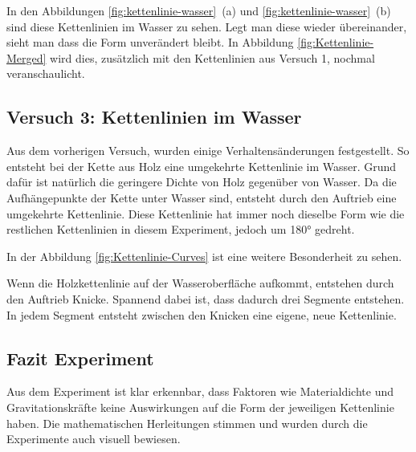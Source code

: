 In den Abbildungen \ref{fig:kettenlinie-wasser}~(a) und
\ref{fig:kettenlinie-wasser}~(b) sind diese Kettenlinien im Wasser zu sehen.
Legt man diese wieder übereinander, sieht man dass die Form unverändert bleibt.
In Abbildung \ref{fig:Kettenlinie-Merged} wird dies, zusätzlich mit den Kettenlinien aus Versuch 1, nochmal veranschaulicht.

\subsection{Versuch 3: Kettenlinien im Wasser
\label{kettenlinie:subsection:wasser}}

Aus dem vorherigen Versuch, wurden einige Verhaltensänderungen festgestellt.
So entsteht bei der Kette aus Holz eine umgekehrte Kettenlinie im Wasser.
Grund dafür ist natürlich die geringere Dichte von Holz gegenüber von Wasser.
Da die Aufhängepunkte der Kette unter Wasser sind, entsteht durch den Auftrieb eine umgekehrte Kettenlinie.
Diese Kettenlinie hat immer noch dieselbe Form wie die restlichen Kettenlinien in diesem Experiment, jedoch um 180° gedreht.

In der Abbildung \ref{fig:Kettenlinie-Curves} ist eine weitere Besonderheit zu sehen.

Wenn die Holzkettenlinie auf der Wasseroberfläche aufkommt, entstehen durch den Auftrieb Knicke.
Spannend dabei ist, dass dadurch drei Segmente entstehen.
In jedem Segment entsteht zwischen den Knicken eine eigene, neue Kettenlinie.


\subsection{Fazit Experiment
\label{kettenlinie:subsection:fazit-experiment}}
Aus dem Experiment ist klar erkennbar, dass Faktoren wie Materialdichte und Gravitationskräfte keine Auswirkungen auf die Form der jeweiligen Kettenlinie haben.
Die mathematischen Herleitungen stimmen und wurden durch die Experimente auch visuell bewiesen.
